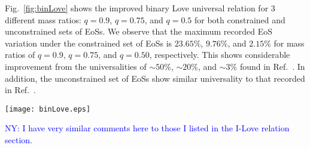 \documentclass[prd,twocolumn,nofootinbib,superscriptaddress,amsmath,amssymb]{revtex4-1}
\newcommand{\ny}[1]{\textcolor{blue}{NY: #1} }
\begin{document}
Fig.~\ref{fig:binLove} shows the improved binary Love universal relation for 3 different mass ratios: $q=0.9$, $q=0.75$, and $q=0.5$ for both constrained and unconstrained sets of EoSs.
We observe that the maximum recorded EoS variation under the constrained set of EoSs is $23.65\%$, $9.76\%$, and $2.15\%$ for mass ratios of $q=0.9$, $q=0.75$, and $q=0.50$, respectively.
This shows considerable improvement from the universalities of $\sim 50\%$, $\sim 20\%$, and $\sim 3\%$ found in Ref.~\cite{Yagi:binLove}.
In addition, the unconstrained set of EoSs show similar universality to that recorded in Ref.~\cite{Yagi:binLove}.
\begin{figure*}
\begin{center} 
\texttt{[image: binLove.eps]}
\end{center}
\caption{
Binary Love universal relations shown for the constrained EoSs (left) and unconstrained EoSs (right).
In this figure, the dashed black line corresponds to the fit given by Eq.~\ref{eq:binLovefit}, while the dotted blue, dashed magenta, and solid green lines represent the 35 EoSs for mass ratios of $q=0.9$, $q=0.75$, and $q=0.50$, respectively.
The maximal EoS variation for each value of $q$ is $23.65\%$, $9.76\%$, and $2.15\%$ respectively, compared to $\sim 50\%$, $\sim 20\%$, and $\sim 3\%$ found in Ref.~\cite{Yagi:binLove}.
These values are comparable to the maximal EoS variation for unconstrained EoSs as expected, found to be $41.66\%$, $12.64\%$, and $3.83\%$.
Additionally shown is the binary Love relations for hybrid stars (dash-dash-dotted curves) as discussed in Sec.~\label{sec:hybrid}.
Observe the large deviations from the fit as the mass ratio $q$ increases, returning near the fit before the transitional pressure at large values of $\Lambda_s$.
}
\label{fig:binLove}
\end{figure*} 

{\ny{I have very similar comments here to those I listed in the I-Love relation section.}}
\end{document}
